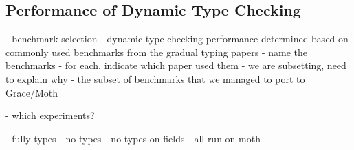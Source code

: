\subsection{Performance of Dynamic Type Checking}

\begin{cnote}
- benchmark selection
 - dynamic type checking performance determined based on commonly used
   benchmarks from the gradual typing papers
   - name the benchmarks
   - for each, indicate which paper used them
   - we are subsetting, need to explain why
     - the subset of benchmarks that we managed to port to Grace/Moth


  - which experiments?
  
  - fully types
  - no types
  - no types on fields
  - all run on moth

\end{cnote}

